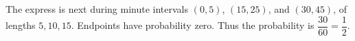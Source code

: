 The express is next during minute intervals $(0,5)$, $(15,25)$, and $(30,45)$, of lengths $ 5,10,15 $. Endpoints have probability zero. Thus the probability is $\boxed{\dfrac{30}{60}=\dfrac{1}{2}}$.
